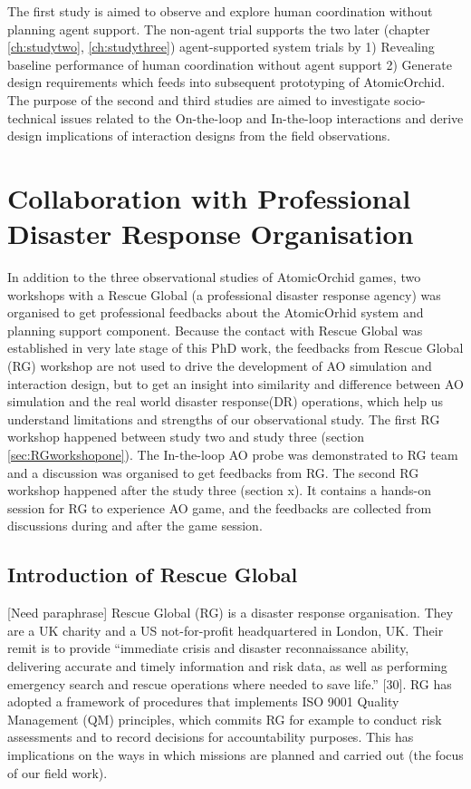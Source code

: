 The first study is aimed to observe and explore human coordination without planning agent support. The non-agent trial supports the two later (chapter \ref{ch:studytwo}, \ref{ch:studythree}) agent-supported system trials by 1) Revealing baseline performance of human coordination without agent support 2) Generate design requirements which feeds into subsequent prototyping of AtomicOrchid. The purpose of the second and third studies are aimed to investigate socio-technical issues related to the On-the-loop and In-the-loop interactions and derive design implications of interaction designs from the field observations.\\

\section{Collaboration with Professional Disaster Response Organisation}
In addition to the three observational studies of AtomicOrchid games, two workshops with a Rescue Global (a professional disaster response agency) was organised to get professional feedbacks about the AtomicOrhid system and planning support component. Because the contact with Rescue Global was established in very late stage of this PhD work, the feedbacks from Rescue Global (RG) workshop are not used to drive the development of AO simulation and interaction design, but to get an insight into similarity and difference between AO simulation and the real world disaster response(DR) operations, which help us understand limitations and strengths of our observational study.  The first RG workshop happened between study two and study three (section \ref{sec:RGworkshopone}). The In-the-loop AO probe was demonstrated to RG team and a discussion was organised to get feedbacks from RG. The second RG workshop happened after the study three (section x). It contains a hands-on session for RG to experience AO game, and the feedbacks are collected from discussions during and after the game session.\\

\subsection{Introduction of Rescue Global}
[Need paraphrase] Rescue Global (RG) is a disaster response organisation. They are a UK charity and a US not-for-profit headquartered in London, UK. Their remit is to provide ``immediate crisis and disaster reconnaissance ability, delivering accurate and timely information and risk data, as well as performing emergency search and rescue operations where needed to save life.'' [30]. RG has adopted a framework of procedures that implements ISO 9001 Quality Management (QM) principles, which commits RG for example to conduct risk assessments and to record decisions for accountability purposes. This has implications on the ways in which missions are planned and carried out (the focus of our field work).\\

